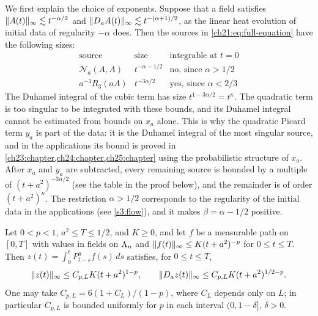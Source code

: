 We first explain the choice of exponents. Suppose that a field satisfies $\lVert A(t)\rVert_\infty\lesssim t^{-\alpha/2}$ and $\lVert D_aA(t)\rVert_\infty\lesssim t^{-(\alpha+1)/2}$, as the linear heat evolution of initial data of regularity $-\alpha$ does. Then the sources in \eqref{ch21:eq:full-equation} have the following sizes:
\[
 \begin{array}{c|c|c}
 \text{source}&\text{size}&\text{integrable at }t=0\\ \hline
 \mathcal N_a(A,A)&t^{-\alpha-1/2}&\text{no, since }\alpha>1/2\\
 a^{-3}R_3(aA)&t^{-3\alpha/2}&\text{yes, since }\alpha<2/3
 \end{array}
\]
The Duhamel integral of the cubic term has size $t^{1-3\alpha/2}=t^\kappa$. The quadratic term is too singular to be integrated with these bounds, and its Duhamel integral cannot be estimated from bounds on $x_a$ alone. This is why the quadratic Picard term $y_a$ is part of the data: it is the Duhamel integral of the most singular source, and in the applications its bound is proved in \cref{ch23:chapter,ch24:chapter,ch25:chapter} using the probabilistic structure of $x_a$. After $x_a$ and $y_a$ are subtracted, every remaining source is bounded by a multiple of $(t+a^2)^{-3\alpha/2}$ (see the table in the proof below), and the remainder is of order $(t+a^2)^\kappa$. The restriction $\alpha>1/2$ corresponds to the regularity of the initial data in the applications (see \cref{s3:flow}), and it makes $\beta=\alpha-1/2$ positive.

\begin{lemma}\label{ch21:lem:source-convolution}
Let $0<p<1$, $a^2\le T\le1/2$, and $K\ge0$, and let $f$ be a measurable path on $[0,T]$ with values in fields on $\Lambda_{n}$ and $\lVert f(t)\rVert_\infty\le K(t+a^2)^{-p}$ for $0\le t\le T$. Then $z(t)=\int_0^tP^a_{t-s}f(s)\,ds$ satisfies, for $0\le t\le T$,
\begin{equation}\label{ch21:eq:source-convolution}
 \lVert z(t)\rVert_\infty\le C_{p,L}K(t+a^2)^{1-p},\qquad
 \lVert D_az(t)\rVert_\infty\le C_{p,L}K(t+a^2)^{1/2-p}.
\end{equation}
One may take $C_{p,L}=6(1+C_L)/(1-p)$, where $C_L$ depends only on $L$; in particular $C_{p,L}$ is bounded uniformly for $p$ in each interval $(0,1-\delta]$, $\delta>0$.
\end{lemma}

